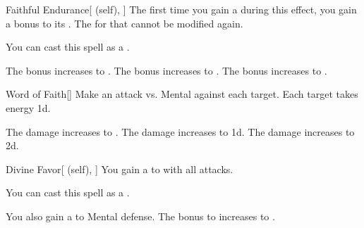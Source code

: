 \lowercase{\hypertarget{spell:Faithful Endurance}{}}\label{spell:Faithful Endurance}
\begin{attuneability}[Rank 1]{\hypertarget{spell:Faithful Endurance}{Faithful Endurance}}[ (self), ]
The first time you gain a  during this effect, you gain a  bonus to its .
The  for that  cannot be modified again.

You can cast this spell as a .

\rankline
{} The bonus increases to .
 The bonus increases to .
 The bonus increases to .
\end{attuneability}
\vspace{0.25em}



\lowercase{\hypertarget{spell:Word of Faith}{}}\label{spell:Word of Faith}
\begin{freeability}[Rank 1]{\hypertarget{spell:Word of Faith}{Word of Faith}}[]
Make an attack vs. Mental against each target.
\hit Each target takes energy  \minus1d.

\rankline
{} The damage increases to .
 The damage increases to  \plus1d.
 The damage increases to  \plus2d.
\end{freeability}
\vspace{0.25em}



\lowercase{\hypertarget{spell:Divine Favor}{}}\label{spell:Divine Favor}
\begin{attuneability}[Rank 3]{\hypertarget{spell:Divine Favor}{Divine Favor}}[ (self), ]
You gain a   to  with all attacks.

You can cast this spell as a .

\rankline
{} You also gain a   to Mental defense.
 The bonus to  increases to .
\end{attuneability}
\vspace{0.25em}



